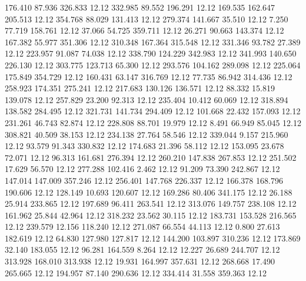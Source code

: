  176.410   87.936  326.833        12.12
 332.985   89.552  196.291        12.12
 169.535  162.647  205.513        12.12
 354.768   88.029  131.413        12.12
 279.374  141.667   35.510        12.12
   7.250   77.719  158.761        12.12
  37.066   54.725  359.711        12.12
  26.271   90.663  143.374        12.12
 167.382   55.977  351.306        12.12
 310.348  167.364  315.548        12.12
 331.346   93.782   27.389        12.12
 223.957   91.087   74.038        12.12
 338.790  124.229  342.983        12.12
 341.993  140.650  226.130        12.12
 303.775  123.713   65.300        12.12
 293.576  104.162  289.098        12.12
 225.064  175.849  354.729        12.12
 160.431   63.147  316.769        12.12
  77.735   86.942  314.436        12.12
 258.923  174.351  275.241        12.12
 217.683  130.126  136.571        12.12
  88.332   15.819  139.078        12.12
 257.829   23.200   92.313        12.12
 235.404   10.412   60.069        12.12
 318.894  138.582  284.495        12.12
 321.731  141.734  294.409        12.12
 101.668   22.432  157.093        12.12
 231.261   46.743   82.874        12.12
 228.808   88.701   19.979        12.12
   8.491   66.949   85.045        12.12
 308.821   40.509   38.153        12.12
 234.138   27.764   58.546        12.12
 339.044    9.157  215.960        12.12
  93.579   91.343  330.832        12.12
 174.683   21.396   58.112        12.12
 153.095   23.678   72.071        12.12
  96.313  161.681  276.394        12.12
 260.210  147.838  267.853        12.12
 251.502   17.629   56.570        12.12
 277.288  102.416    2.462        12.12
  91.209   73.390  242.867        12.12
 147.014  147.009  357.246        12.12
 256.401  147.768  226.337        12.12
 166.378  168.796  190.606        12.12
 128.149   10.693  120.607        12.12
 169.286   80.406  341.175        12.12
  26.188   25.914  233.865        12.12
 197.689   96.411  263.541        12.12
 313.076  149.757  238.108        12.12
 161.962   25.844   42.964        12.12
 318.232   23.562   30.115        12.12
 183.731  153.528  216.565        12.12
 239.579   12.156  118.240        12.12
 271.087   66.554   44.113        12.12
   0.800   27.613  182.619        12.12
  64.830  127.980  127.817        12.12
 144.200  103.897  310.236        12.12
 173.869   32.140  183.055        12.12
  96.281  164.559    8.264        12.12
  12.227   26.689  244.707        12.12
 313.928  168.010  313.938        12.12
  19.931  164.997  357.631        12.12
 268.668   17.490  265.665        12.12
 194.957   87.140  290.636        12.12
 334.414   31.558  359.363        12.12
